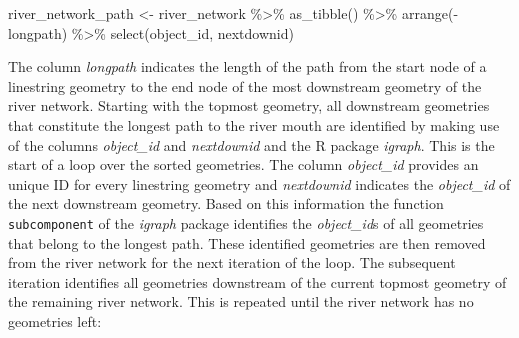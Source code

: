 \documentclass[fleqn,10pt]{wlscirep}
\newenvironment{Shaded}{\begin{snugshade}}{\end{snugshade}}
\newcommand{\FunctionTok}[1]{\textcolor[rgb]{0.00,0.00,0.00}{#1}}
\newcommand{\NormalTok}[1]{#1}
\newcommand{\OtherTok}[1]{\textcolor[rgb]{0.56,0.35,0.01}{#1}}
\newcommand{\SpecialCharTok}[1]{\textcolor[rgb]{0.00,0.00,0.00}{#1}}
\begin{document}
\small

\begin{Shaded}
\begin{Highlighting}[]
\NormalTok{river\_network\_path }\OtherTok{\textless{}{-}} 
\NormalTok{  river\_network }\SpecialCharTok{\%\textgreater{}\%} 
  \FunctionTok{as\_tibble}\NormalTok{() }\SpecialCharTok{\%\textgreater{}\%} 
  \FunctionTok{arrange}\NormalTok{(}\SpecialCharTok{{-}}\NormalTok{longpath) }\SpecialCharTok{\%\textgreater{}\%} 
  \FunctionTok{select}\NormalTok{(object\_id, nextdownid)}
\end{Highlighting}
\end{Shaded}

\normalsize

The column \emph{longpath} indicates the length of the path from the start node of a linestring geometry to the end node of the most downstream geometry of the river network. Starting with the topmost geometry, all downstream geometries that constitute the longest path to the river mouth are identified by making use of the columns \emph{object\_id} and \emph{nextdownid} and the R package \emph{igraph}. This is the start of a loop over the sorted geometries. The column \emph{object\_id} provides an unique ID for every linestring geometry and \emph{nextdownid} indicates the \emph{object\_id} of the next downstream geometry. Based on this information the function \texttt{subcomponent} of the \emph{igraph} package identifies the \emph{object\_id}s of all geometries that belong to the longest path. These identified geometries are then removed from the river network for the next iteration of the loop. The subsequent iteration identifies all geometries downstream of the current topmost geometry of the remaining river network. This is repeated until the river network has no geometries left:

\small
\end{document}
